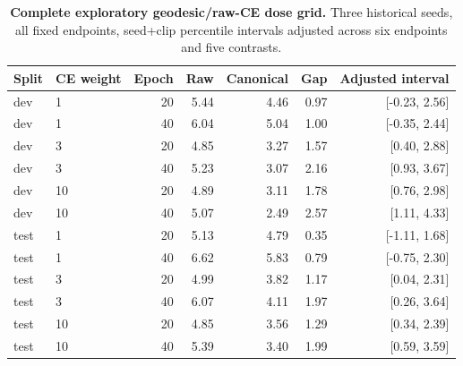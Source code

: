 \begin{table}[t]\centering\small
\caption{\textbf{Complete exploratory geodesic/raw-CE dose grid.} Three historical seeds, all fixed endpoints, seed+clip percentile intervals adjusted across six endpoints and five contrasts.}
\label{tab:dosegrid}\begin{tabular}{llrrrrr}\toprule
Split & CE weight & Epoch & Raw & Canonical & Gap & Adjusted interval\\\midrule
dev & 1 & 20 & 5.44 & 4.46 & 0.97 & [-0.23, 2.56]\\
dev & 1 & 40 & 6.04 & 5.04 & 1.00 & [-0.35, 2.44]\\
dev & 3 & 20 & 4.85 & 3.27 & 1.57 & [0.40, 2.88]\\
dev & 3 & 40 & 5.23 & 3.07 & 2.16 & [0.93, 3.67]\\
dev & 10 & 20 & 4.89 & 3.11 & 1.78 & [0.76, 2.98]\\
dev & 10 & 40 & 5.07 & 2.49 & 2.57 & [1.11, 4.33]\\
test & 1 & 20 & 5.13 & 4.79 & 0.35 & [-1.11, 1.68]\\
test & 1 & 40 & 6.62 & 5.83 & 0.79 & [-0.75, 2.30]\\
test & 3 & 20 & 4.99 & 3.82 & 1.17 & [0.04, 2.31]\\
test & 3 & 40 & 6.07 & 4.11 & 1.97 & [0.26, 3.64]\\
test & 10 & 20 & 4.85 & 3.56 & 1.29 & [0.34, 2.39]\\
test & 10 & 40 & 5.39 & 3.40 & 1.99 & [0.59, 3.59]\\
\bottomrule\end{tabular}\end{table}
